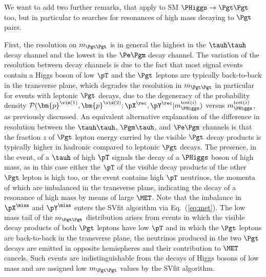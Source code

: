 We want to add two further remarks, that apply to SM $\PHiggs \to
\Pgt\Pgt$ too, but in particular to searches for resonances of high
mass decaying to $\Pgt$ pairs.

First, the resolution on $m_{\Pgt\Pgt}$ is in general the highest in the $\tauh\tauh$ decay channel and the
lowest in the $\Pe\Pgm$ decay channel.
The variation of the resolution between decay channels is due to the fact
that most signal events contain a Higgs boson of low
$\pT$ and the $\Pgt$ leptons are typically back-to-back in the
transverse plane, which degrades the resolution in $m_{\Pgt\Pgt}$ in
particular for events with leptonic $\Pgt$ decays,
due to the degeneracy of the probability density
$\mathcal{P}(\bm{p}^{\vis(1)},\bm{p}^{\vis(2)};\pX^{\rec},\pY^{\rec}|m_{\PHiggs}^{\textrm{test}(i)})$
versus $m_{\PHiggs}^{\textrm{test}(i)}$, as previously discussed.
An equivalent alternative explanation of the difference in resolution between the $\tauh\tauh$, $\Pgm\tauh$, and $\Pe\Pgm$ channels
is that the fraction $z$ of $\Pgt$ lepton energy carried by the visible $\Pgt$ decay
products is typically higher in hadronic compared to leptonic $\Pgt$ decays.
The presence, in the event, of a $\tauh$ of high $\pT$ signals the decay of a
$\PHiggs$ boson of high mass,
as in this case either the $\pT$ of the visible decay products of the
other $\Pgt$ lepton is high too,
or the event contains high $\pT$ neutrinos, the momenta of which are imbalanced in the transverse plane,
indicating the decay of a resonance of high mass by means of large $\MET$.
Note that the imbalance in $\pX^{\miss}$ and $\pY^{\miss}$ enters the
SVfit algorithm via Eq.~(\ref{eq:met}).
The low mass tail of the $m_{\Pgt\Pgt}$ distribution arises from
events in which the visible decay products of both $\Pgt$ leptons have
low $\pT$ and in which the $\Pgt$ leptons are back-to-back in the
transverse plane, the neutrinos produced in the two
$\Pgt$ decays are emitted in opposite hemispheres and their contribution to $\MET$ cancels.
Such events are indistinguishable from the decays of Higgs bosons of low mass
and are assigned low $m_{\Pgt\Pgt}$ values by the SVfit algorithm.


